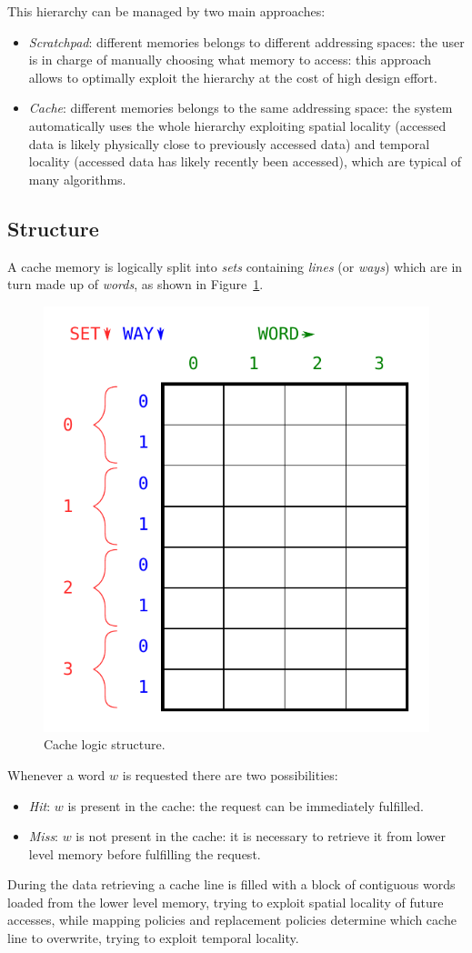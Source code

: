 \documentclass[11pt,a4paper,oneside]{memoir}
\begin{document}
This hierarchy can be managed by two main approaches:
\begin{itemize}
	\item \emph{Scratchpad}: different memories belongs to different
		addressing spaces: the user is in charge of manually choosing
		what memory to access: this approach allows to optimally
		exploit the hierarchy at the cost of high design effort.
	\item \emph{Cache}: different memories belongs to the same addressing
		space: the system automatically uses the whole hierarchy
		exploiting spatial locality (accessed data is likely physically
		close to previously accessed data) and temporal locality
		(accessed data has likely recently been accessed), which are
		typical of many algorithms.
\end{itemize}

\subsection{Structure}
A cache memory is logically split into \emph{sets} containing \emph{lines} (or
\emph{ways}) which are in turn made up of \emph{words}, as shown in
Figure~\ref{fig:cache_logic_structure}.

\begin{figure}
	\centering
	\includegraphics[width=.5\textwidth]{cache_logic_structure}
	\caption{Cache logic structure.}
	\label{fig:cache_logic_structure}
\end{figure}

Whenever a word $w$ is requested there are two possibilities:
\begin{itemize}
	\item \emph{Hit}: $w$ is present in the cache: the request can be
		immediately fulfilled.
	\item \emph{Miss}: $w$ is not present in the cache: it is necessary to
		retrieve it from lower level memory before fulfilling the
		request.
\end{itemize}
During the data retrieving a cache line is filled with a block of contiguous
words loaded from the lower level memory, trying to exploit spatial locality of
future accesses, while mapping policies and replacement policies determine which
cache line to overwrite, trying to exploit temporal locality.
\end{document}
